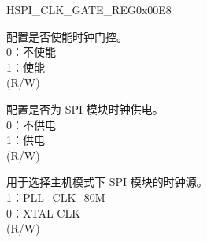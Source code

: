 \begin{register}{H}{SPI\_CLK\_GATE\_REG}{0x00E8}\label{regdesc:SPICLKGATEREG}
%
%
%
%
\regnewline%
\begin{regdesc}\begin{reglist}
\label{fielddesc:SPICLKEN}\item [SPI\_CLK\_EN] 配置是否使能时钟门控。\\
0：不使能\\
1：使能\\
(R/W)
\label{fielddesc:SPIMSTCLKACTIVE}\item [SPI\_MST\_CLK\_ACTIVE] 配置是否为 SPI 模块时钟供电。\\
0：不供电\\
1：供电\\
(R/W)

\label{fielddesc:SPIMSTCLKSEL}\item [SPI\_MST\_CLK\_SEL] 用于选择主机模式下 SPI 模块的时钟源。\\
1：PLL\_CLK\_80M\\
0：XTAL CLK\\
(R/W)
\end{reglist}\end{regdesc}
\end{register}


